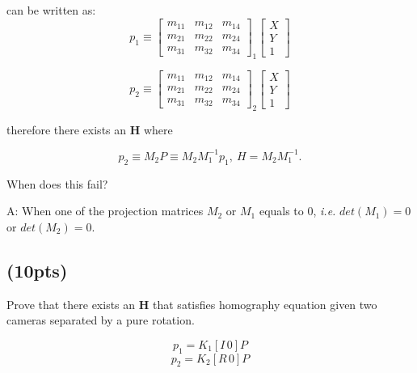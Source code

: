 \documentclass[12pt]{article}
\begin{document}
can be written as:
\begin{equation}
 p_1 \equiv \left[ \begin{matrix}
      m_{11} & m_{12} & m_{14} \\
      m_{21} & m_{22} & m_{24} \\
      m_{31} & m_{32} & m_{34}
    \end{matrix} \right]_1
\left[ \begin{matrix}
X\\
Y\\
1
\end{matrix} \right]
\end{equation}

\begin{equation}
 p_2 \equiv \left[ \begin{matrix}
      m_{11} & m_{12} & m_{14} \\
      m_{21} & m_{22} & m_{24} \\
      m_{31} & m_{32} & m_{34}
    \end{matrix} \right]_2
\left[ \begin{matrix}
X\\
Y\\
1
\end{matrix} \right]
\end{equation}

therefore there exists an $\bm{H}$ where

\begin{equation}
  p_2 \equiv M_2 P \equiv M_2 M^{-1}_1 p_1, \ H = M_2 M^{-1}_1.
\end{equation}

When does this fail?

A: When one of the projection matrices $M_2$ or $M_1$ equals to $0$, \emph{i.e.} $det(M_1) = 0$ or $det(M_2) =0$.


\pagebreak

\subsection{(10pts)}
\label{rot}

Prove that there exists an $\bm{H}$ that satisfies homography equation given two cameras separated by a pure rotation.

\begin{equation*}
  p_1 = K_1 [I\,0] P
\end{equation*}
\begin{equation}
  p_2 = K_2 [R\, 0] P
\end{equation}
\end{document}
